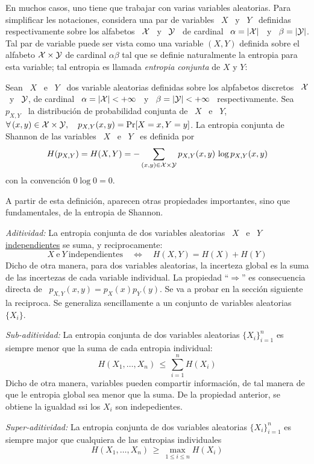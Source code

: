 En muchos  casos, uno tiene que  trabajar con varias  variables aleatorias. Para
simplificar les  notaciones, considera una par  de variables \  $X$ \ y \  $Y$ \
definidas respectivamente sobre los alfabetos \ $\mathcal{X}$  \ y \ $\mathcal{Y}$ \ de cardinal \
$\alpha = |\mathcal{X}|$ \ y \ $\beta =  |\mathcal{Y}|$.  Tal par de variable puede ser vista como
una  variable $(X,Y)$  definida sobre  el alfabeto  $\mathcal{X} \times  \mathcal{Y}$  de cardinal
$\alpha \beta$ tal  que se definie naturalmente la  entropia para esta variable;
tal entropia es llamada {\it entropia conjunta} de $X$ y $Y$:
%
\begin{definicion}\label{def:SZ:EntropiaConjunta}
  Sean \ $X$ \ e \ $Y$  \ dos variable aleatorias definidas sobre los alpfabetos
  discretos \  $\mathcal{X}$ \ y \ $\mathcal{Y}$,  de cardinal \ $\alpha  = |\mathcal{X}| < +\infty$  \ y \
  $\beta  =   |\mathcal{Y}|  <  +\infty$  \   respectivamente.  Sea  \   $p_{X,Y}$  \  la
  distribuci\'on de probabilidad conjunta de \ $X$ \ e \ $Y$, \ \ie $ \forall \,
  (x,y) \in \mathcal{X} \times \mathcal{Y}, \quad p_{X,Y}(x,y) =  \Pr[X = x , Y = y]$. La entropia
  conjunta de Shannon de las variables \ $X$ \ e \ $Y$ \ es definida por
  \[
  H(p_{X,Y}) =  H(X,Y) = -  \sum_{(x,y) \in \mathcal{X}  \times \mathcal{Y}} p_{X,Y}(x,y)  \, \log
  p_{X,Y}(x,y)
  \]
  con la convenci\'on $0 \log 0 = 0$.
\end{definicion}

A partir de esta definici\'on,  aparecen otras propiedades importantes, sino que
fundamentales, de la entropia de Shannon.
%
\begin{propiedades}
\item\label{prop:SZ:aditividad}  {\it Aditividad:} La  entropia conjunta  de dos
  variables aleatorias  \ $X$  \ e \  $Y$ \underline{independientes} se  suma, y
  reciprocamente:
  \[
  X \: \mbox{e} \: Y \: \mbox{independientes} \quad \Leftrightarrow \quad H(X,Y)
  =  H(X) +  H(Y)
  \]
  Dicho de otra manera, para dos variables aleatorias, la incerteza global es la
  suma   de  las  incertezas   de  cada   variable  individual.    La  propiedad
  ``$\Rightarrow$'' es consecuencia directa de \ $p_{X,Y}(x,y) = p_X(x) p_Y(y)$.
  Se  va  a  probar  en  la  secci\'on siguiente  la  reciproca.  Se  generaliza
  sencillamente a un conjunto de variables aleatorias $\{ X_i \}$.
%
\item\label{prop:SZ:subaditividad} {\it Sub-aditividad:} La entropia conjunta de
  dos variables aleatorias  $\{ X_i \}_{i=1}^n$ es siempre menor  que la suma de
  cada entropia individual:
  \[
  H(X_1,\ldots,X_n)  \,  \le \,  \sum_{i=1}^n  H(X_i)
  \]
  Dicho de otra manera, variables  pueden compartir informaci\'on, de tal manera
  de que le entropia global sea menor que la suma.  De la propiedad anterior, se
  obtiene la igualdad ssi los $X_i$ son indepedientes.
%
\item\label{prop:SZ:superaditividad}   {\it   Super-aditividad:}   La   entropia
  conjunta de dos variables aleatorias  $\{ X_i \}_{i=1}^n$ es siempre major que
  cualquiera  de  las entropias  individuales
  \[
  H(X_1,\ldots,X_n) \, \ge \, \max_{1 \le i \le n} H(X_i)
  \]
\end{propiedades}


